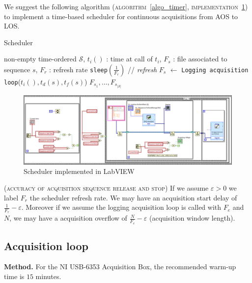 \documentclass[twocolumn,pre,floats,aps,amsmath,amssymb]{revtex4}
\newenvironment{remark}[1][Remarque.]{\begin{trivlist}
\item[\hskip \labelsep {\bfseries #1}]}{\end{trivlist}}
\begin{document}
We suggest the following algorithm (\textsc{algorithm}~\ref{algo_timer}, \textsc{implementation~\ref{fig:algo_timer_labview}}) to implement a time-based scheduler for continuous acquisitions from AOS to LOS.

\begin{algorithm}[h]
\caption{Scheduler}
\label{algo_timer}
\begin{algorithmic}[1]
  \REQUIRE non-empty time-ordered $\mathcal{S}$, $t_i()$ : time at call of $t_i$, $F_s$ : file associated to sequence $s$, $F_r$ : refresh rate
  \STATE \texttt{sleep}$(\frac{1}{F_r})$ \hfill // \textit{refresh}
  \ENDWHILE
  \STATE $F_s$ $\leftarrow$ \texttt{Logging acquisition loop}($t_i (), t_d (s), t_f (s)$)
  \ENDFOR
  \RETURN $F_{s_1}, \dots, F_{s_{\left | \mathcal{S} \right |}}$
\end{algorithmic}
\end{algorithm}

\begin{figure}[]
  \includegraphics[width=17.5cm]{pictures/minuterie.png}
\caption{Scheduler implemented in LabVIEW}
\label{fig:algo_timer_labview}
\end{figure}

\begin{remark}
  \textsc{(accuracy of acquisition sequence release and stop)}
  If we assume $\varepsilon > 0$ we label $F_r$ the scheduler refresh rate. We may have an acquisition start delay of $\frac{1}{F_r} - \varepsilon$. Moreover if we assume the logging acquisition loop is called with $F_e$ and $N$, we may have a acquisition overflow of $\frac{N}{F_e} - \varepsilon$ (acquisition window length).
\end{remark}

\subsection{Acquisition loop}

\noindent
\textbf{Method.} For the NI USB-6353 Acquisition Box, the recommended warm-up time is $15$ minutes\cite{NI_6353_datasheet}.
\end{document}
